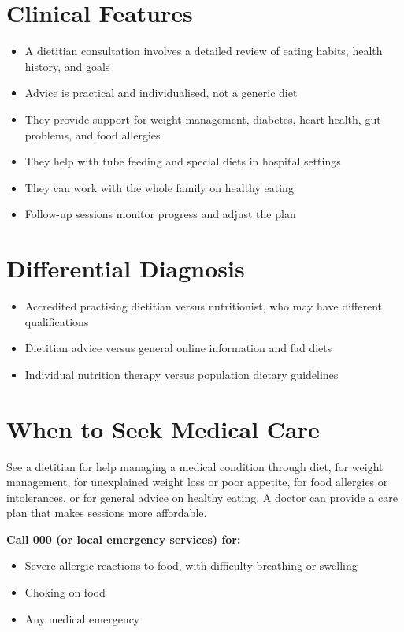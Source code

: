 \section*{Clinical Features}
\begin{itemize}
    \item A dietitian consultation involves a detailed review of eating habits, health history, and goals
    \item Advice is practical and individualised, not a generic diet
    \item They provide support for weight management, diabetes, heart health, gut problems, and food allergies
    \item They help with tube feeding and special diets in hospital settings
    \item They can work with the whole family on healthy eating
    \item Follow-up sessions monitor progress and adjust the plan
\end{itemize}

\section*{Differential Diagnosis}
\begin{itemize}
    \item Accredited practising dietitian versus nutritionist, who may have different qualifications
    \item Dietitian advice versus general online information and fad diets
    \item Individual nutrition therapy versus population dietary guidelines
\end{itemize}

\section*{When to Seek Medical Care}
See a dietitian for help managing a medical condition through diet, for weight management, for unexplained weight loss or poor appetite, for food allergies or intolerances, or for general advice on healthy eating. A doctor can provide a care plan that makes sessions more affordable.

\textbf{Call 000 (or local emergency services) for:}
\begin{itemize}
    \item Severe allergic reactions to food, with difficulty breathing or swelling
    \item Choking on food
    \item Any medical emergency
\end{itemize}

